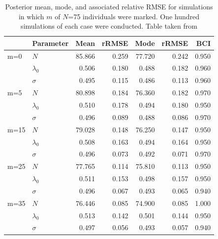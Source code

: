 \begin{table}[ht]
\centering
\caption{Posterior mean, mode, and associated relative RMSE for simulations in
  which $m$ of $N$=75 individuals were marked. One hundred simulations of each case were conducted. Table taken from \citet{chandler_royle:2012} }
\begin{tabular}{llrrrrr}
     \hline
     &	Parameter    &	Mean   &	rRMSE  & Mode   & rRMSE &	BCI    \\
     \hline
 m=0 &	$N$          &	85.866 &    0.259 & 77.720 &    0.242 & 0.950  \\
     &	$\lambda_0$  &	0.506  &	0.180 &	0.488  &	0.182 &	0.960  \\
     &	$\sigma$     &	0.495  &	0.115 &	0.486  &	0.113 &	0.960  \\
     \hline
 m=5 &	$N$          &	80.898 &    0.184 & 76.360 &    0.182 & 0.970  \\
     &	$\lambda_0$  &	0.510  &    0.178 & 0.494  &    0.180 & 0.950  \\
     &	$\sigma$     &	0.496  &    0.089 & 0.488  &    0.086 & 0.970  \\
     \hline
 m=15&	$N$          &	79.028 &    0.148 & 76.250 &    0.147 & 0.950  \\
     &	$\lambda_0$  &	0.508  &    0.163 & 0.494  &    0.164 & 0.950  \\
     &	$\sigma$     &	0.496  &    0.073 & 0.492  &    0.071 & 0.970  \\
     \hline
 m=25&	$N$          &	77.765 &    0.114 & 75.810 &    0.113 & 0.950  \\
     &	$\lambda_0$  &	0.511  &    0.153 & 0.498  &    0.157 & 0.950  \\
     &	$\sigma$     &	0.496  &    0.067 & 0.493  &    0.065 & 0.940  \\
     \hline
 m=35&	$N$          &	76.446 &    0.085 & 74.900 &    0.085 & 1.000  \\
     &	$\lambda_0$  &	0.513  &    0.142 & 0.501  &    0.144 & 0.950  \\
     &	$\sigma$     &	0.497  &    0.056 & 0.493  &    0.057 & 0.940  \\
 \hline
\end{tabular}
\label{partialID.tab.sim}
\end{table}

